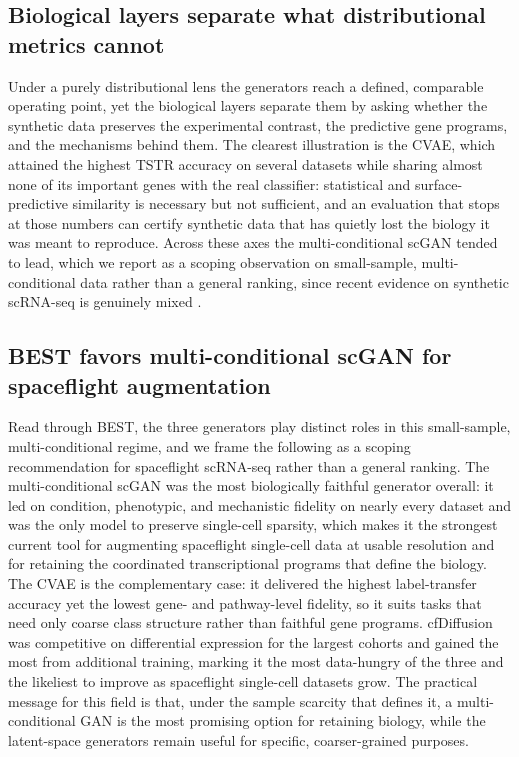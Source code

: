 \documentclass[11pt]{article}
\newcommand{\fides}{BEST}
\begin{document}
\subsection{Biological layers separate what distributional metrics cannot}
Under a purely distributional lens the generators reach a defined, comparable operating point, yet the biological layers separate them by asking whether the synthetic data preserves the experimental contrast, the predictive gene programs, and the mechanisms behind them. The clearest illustration is the CVAE, which attained the highest TSTR accuracy on several datasets while sharing almost none of its important genes with the real classifier: statistical and surface-predictive similarity is necessary but not sufficient, and an evaluation that stops at those numbers can certify synthetic data that has quietly lost the biology it was meant to reproduce. Across these axes the multi-conditional scGAN tended to lead, which we report as a scoping observation on small-sample, multi-conditional data rather than a general ranking, since recent evidence on synthetic scRNA-seq is genuinely mixed \cite{scdiffusion,cfgen,scgft}.

\subsection{\fides{} favors multi-conditional scGAN for spaceflight augmentation}
Read through \fides{}, the three generators play distinct roles in this small-sample, multi-conditional regime, and we frame the following as a scoping recommendation for spaceflight scRNA-seq rather than a general ranking. The multi-conditional scGAN was the most biologically faithful generator overall: it led on condition, phenotypic, and mechanistic fidelity on nearly every dataset and was the only model to preserve single-cell sparsity, which makes it the strongest current tool for augmenting spaceflight single-cell data at usable resolution and for retaining the coordinated transcriptional programs that define the biology. The CVAE is the complementary case: it delivered the highest label-transfer accuracy yet the lowest gene- and pathway-level fidelity, so it suits tasks that need only coarse class structure rather than faithful gene programs. cfDiffusion was competitive on differential expression for the largest cohorts and gained the most from additional training, marking it the most data-hungry of the three and the likeliest to improve as spaceflight single-cell datasets grow. The practical message for this field is that, under the sample scarcity that defines it, a multi-conditional GAN is the most promising option for retaining biology, while the latent-space generators remain useful for specific, coarser-grained purposes.
\end{document}
